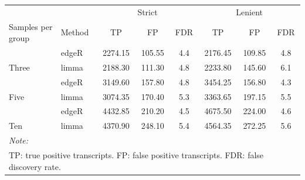 
\begin{tabular}[t]{llcccccc}
\toprule
\multicolumn{2}{c}{ } & \multicolumn{3}{c}{Strict} & \multicolumn{3}{c}{Lenient} \\
\cmidrule(l{3pt}r{3pt}){3-5} \cmidrule(l{3pt}r{3pt}){6-8}
\makecell[l]{Samples per\\group} & Method & TP & FP & FDR & TP & FP & FDR\\
\midrule
 & edgeR & 2274.15 & 105.55 & 4.4 & 2176.45 & 109.85 & 4.8\\

\multirow{-2}{*}{\raggedright\arraybackslash Three} & limma & 2188.30 & 111.30 & 4.8 & 2233.80 & 145.60 & 6.1\\
\cmidrule{1-8}
 & edgeR & 3149.60 & 157.80 & 4.8 & 3454.25 & 156.80 & 4.3\\

\multirow{-2}{*}{\raggedright\arraybackslash Five} & limma & 3074.35 & 170.40 & 5.3 & 3363.65 & 197.15 & 5.5\\
\cmidrule{1-8}
 & edgeR & 4432.85 & 210.20 & 4.5 & 4675.50 & 224.00 & 4.6\\

\multirow{-2}{*}{\raggedright\arraybackslash Ten} & limma & 4370.90 & 248.10 & 5.4 & 4564.35 & 272.25 & 5.6\\
\bottomrule
\multicolumn{8}{l}{\rule{0pt}{1em}\textit{Note: }}\\
\multicolumn{8}{l}{\rule{0pt}{1em}TP: true positive transcripts. FP: false positive transcripts. FDR: false discovery rate.}\\
\end{tabular}
